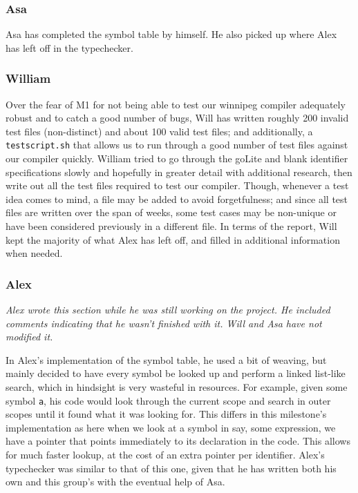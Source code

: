 \documentclass{article}
\begin{document}
\subsubsection{Asa}

Asa has completed the symbol table by himself. He also picked up where Alex has left off in the typechecker. 

\subsubsection{William}

Over the fear of M1 for not being able to test our winnipeg compiler adequately robust and to catch a good number of bugs, Will has written roughly 200 invalid test files (non-distinct) and about 100 valid test files; and additionally, a \verb|testscript.sh| that allows us to run through a good number of test files against our compiler quickly. William tried to go through the goLite and blank identifier specifications slowly and hopefully in greater detail with additional research, then write out all the test files required to test our compiler. Though, whenever a test idea comes to mind, a file may be added to avoid forgetfulness; and since all test files are written over the span of weeks, some test cases may be non-unique or have been considered previously in a different file. In terms of the report, Will kept the majority of what Alex has left off, and filled in additional information when needed.

\subsubsection{Alex}

\textit{Alex wrote this section while he was still working on the project. He
  included comments indicating that he wasn't finished with it. Will and Asa
  have not modified it.}


In Alex's implementation of the symbol table, he used a bit of weaving, but
mainly decided to have every symbol be looked up and perform a linked list-like
search, which in hindsight is very wasteful in resources. For example,
given some symbol \verb$a$, his code would look through the current scope and
search in outer scopes until it found what it was looking for. This differs
in this milestone's implementation as here when we look at a symbol in say, some
expression, we have a pointer that points immediately to its declaration in
the code. This allows for much faster lookup, at the cost of an extra pointer
per identifier. Alex's typechecker was similar to that of this one, given
that he has written both his own and this group's with the eventual help of
Asa.
\end{document}
